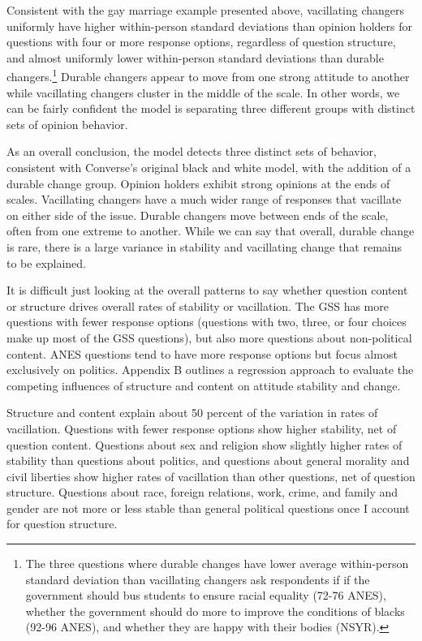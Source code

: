 \documentclass[12pt,]{article}
\begin{document}
Consistent with the gay marriage example presented above, vacillating changers uniformly have higher within-person standard deviations than opinion holders for questions with four or more response options, regardless of question structure, and almost uniformly lower within-person standard deviations than durable changers.\footnote{The three questions where durable changes have lower average within-person standard deviation than vacillating changers ask respondents if if the government should bus students to ensure racial equality (72-76 ANES), whether the government should do more to improve the conditions of blacks (92-96 ANES), and whether they are happy with their bodies (NSYR).} Durable changers appear to move from one strong attitude to another while vacillating changers cluster in the middle of the scale. In other words, we can be fairly confident the model is separating three different groups with distinct sets of opinion behavior.

As an overall conclusion, the model detects three distinct sets of behavior, consistent with Converse's original black and white model, with the addition of a durable change group. Opinion holders exhibit strong opinions at the ends of scales. Vacillating changers have a much wider range of responses that vacillate on either side of the issue. Durable changers move between ends of the scale, often from one extreme to another. While we can say that overall, durable change is rare, there is a large variance in stability and vacillating change that remains to be explained.

It is difficult just looking at the overall patterns to say whether question content or structure drives overall rates of stability or vacillation. The GSS has more questions with fewer response options (questions with two, three, or four choices make up most of the GSS questions), but also more questions about non-political content. ANES questions tend to have more response options but focus almost exclusively on politics. Appendix B outlines a regression approach to evaluate the competing influences of structure and content on attitude stability and change.

Structure and content explain about 50 percent of the variation in rates of vacillation. Questions with fewer response options show higher stability, net of question content. Questions about sex and religion show slightly higher rates of stability than questions about politics, and questions about general morality and civil liberties show higher rates of vacillation than other questions, net of question structure. Questions about race, foreign relations, work, crime, and family and gender are not more or less stable than general political questions once I account for question structure.
\end{document}
